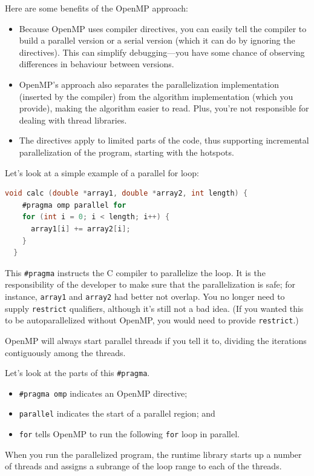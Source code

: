 \documentclass[a4paper]{report}
\begin{document}
Here are some benefits of the OpenMP approach:
\begin{itemize}
\item Because OpenMP uses compiler directives, you can easily tell the
  compiler to build a parallel version or a serial version (which it can do by
  ignoring the directives). This can simplify debugging---you
  have some chance of observing differences in behaviour between 
  versions.
\item OpenMP's approach also separates the parallelization
  implementation (inserted by the compiler) from the algorithm
  implementation (which you provide), making the algorithm easier to
  read. Plus, you're not responsible for dealing with thread libraries.
\item The directives apply to limited parts of the code, thus supporting
  incremental parallelization of the program, starting with the hotspots.
\end{itemize}

Let's look at a simple example of a parallel for loop:
{\small
\begin{lstlisting}[language=C,morekeywords={foreach,pragma,omp,parallel,single,nowait,task,untied,barrier,taskyield}]
  void calc (double *array1, double *array2, int length) {
    #pragma omp parallel for
    for (int i = 0; i < length; i++) {
      array1[i] += array2[i];
    }
  }
\end{lstlisting}
}
This \verb+#pragma+ instructs the C compiler to parallelize the
loop. It is the responsibility of the developer to make sure that
the parallelization is safe; for instance, {\tt array1} and {\tt array2}
had better not overlap. You no longer need to supply {\tt restrict}
qualifiers, although it's still not a bad idea. (If you wanted this
to be autoparallelized without OpenMP, you would need to provide
{\tt restrict}.)

OpenMP will always start parallel threads if you tell it to, dividing
the iterations contiguously among the threads.

Let's look at the parts of this \verb+#pragma+.
\begin{itemize}
\item \verb+#pragma omp+ indicates an OpenMP directive;
\item {\tt parallel} indicates the start of a parallel region; and
\item {\tt for} tells OpenMP to run the following {\tt for} loop in parallel.
\end{itemize}
When you run the parallelized program, the runtime library starts
up a number of threads and assigns a subrange of the loop range to 
each of the threads.
\end{document}
